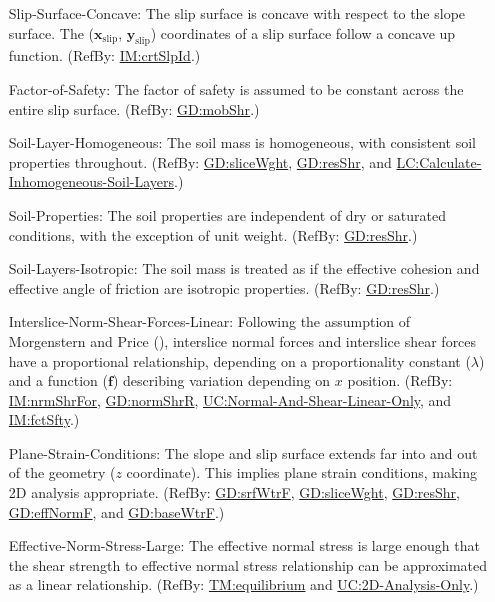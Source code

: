 \documentclass[12pt]{article}
\begin{document}
\begin{itemize}
\item[Slip-Surface-Concave:\phantomsection\label{assumpSSC}]{The slip surface is concave with respect to the slope surface. The (${\symbf{x}_{\text{slip}}}$, ${\symbf{y}_{\text{slip}}}$) coordinates of a slip surface follow a concave up function. (RefBy: \hyperref[IM:crtSlpId]{IM:crtSlpId}.)}
\item[Factor-of-Safety:\phantomsection\label{assumpFOS}]{The factor of safety is assumed to be constant across the entire slip surface. (RefBy: \hyperref[GD:mobShr]{GD:mobShr}.)}
\item[Soil-Layer-Homogeneous:\phantomsection\label{assumpSLH}]{The soil mass is homogeneous, with consistent soil properties throughout. (RefBy: \hyperref[GD:sliceWght]{GD:sliceWght}, \hyperref[GD:resShr]{GD:resShr}, and \hyperref[LC_inhomogeneous]{LC:Calculate-Inhomogeneous-Soil-Layers}.)}
\item[Soil-Properties:\phantomsection\label{assumpSP}]{The soil properties are independent of dry or saturated conditions, with the exception of unit weight. (RefBy: \hyperref[GD:resShr]{GD:resShr}.)}
\item[Soil-Layers-Isotropic:\phantomsection\label{assumpSLI}]{The soil mass is treated as if the effective cohesion and effective angle of friction are isotropic properties. (RefBy: \hyperref[GD:resShr]{GD:resShr}.)}
\item[Interslice-Norm-Shear-Forces-Linear:\phantomsection\label{assumpINSFL}]{Following the assumption of Morgenstern and Price (\cite{morgenstern1965}), interslice normal forces and interslice shear forces have a proportional relationship, depending on a proportionality constant ($λ$) and a function ($\symbf{f}$) describing variation depending on $x$ position. (RefBy: \hyperref[IM:nrmShrFor]{IM:nrmShrFor}, \hyperref[GD:normShrR]{GD:normShrR}, \hyperref[UC_normshearlinear]{UC:Normal-And-Shear-Linear-Only}, and \hyperref[IM:fctSfty]{IM:fctSfty}.)}
\item[Plane-Strain-Conditions:\phantomsection\label{assumpPSC}]{The slope and slip surface extends far into and out of the geometry ($z$ coordinate). This implies plane strain conditions, making 2D analysis appropriate. (RefBy: \hyperref[GD:srfWtrF]{GD:srfWtrF}, \hyperref[GD:sliceWght]{GD:sliceWght}, \hyperref[GD:resShr]{GD:resShr}, \hyperref[GD:effNormF]{GD:effNormF}, and \hyperref[GD:baseWtrF]{GD:baseWtrF}.)}
\item[Effective-Norm-Stress-Large:\phantomsection\label{assumpENSL}]{The effective normal stress is large enough that the shear strength to effective normal stress relationship can be approximated as a linear relationship. (RefBy: \hyperref[TM:equilibrium]{TM:equilibrium} and \hyperref[UC_2donly]{UC:2D-Analysis-Only}.)}

\end{itemize}
\end{document}
